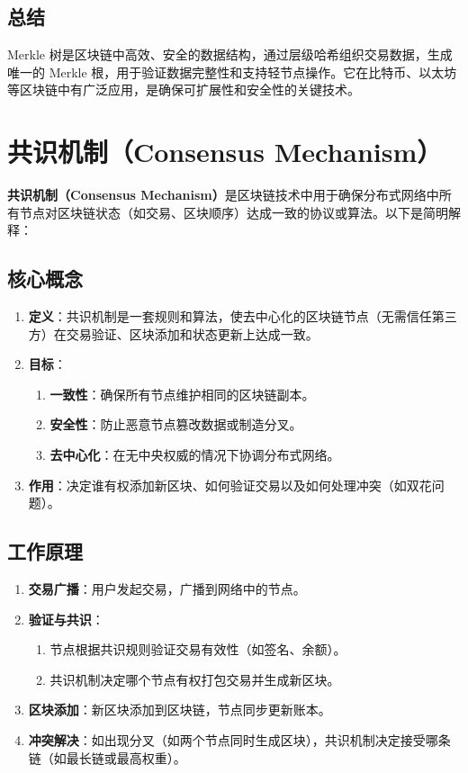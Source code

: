 \documentclass[12pt]{ctexart}
\begin{document}
\subsection{总结}
Merkle 树是区块链中高效、安全的数据结构，通过层级哈希组织交易数据，生成唯一的 Merkle 根，用于验证数据完整性和支持轻节点操作。它在比特币、以太坊等区块链中有广泛应用，是确保可扩展性和安全性的关键技术。

\newpage

\section{共识机制（Consensus Mechanism）}
\textbf{共识机制（Consensus Mechanism）}是区块链技术中用于确保分布式网络中所有节点对区块链状态（如交易、区块顺序）达成一致的协议或算法。以下是简明解释：

\subsection{核心概念}
\begin{enumerate}
    \item \textbf{定义}：共识机制是一套规则和算法，使去中心化的区块链节点（无需信任第三方）在交易验证、区块添加和状态更新上达成一致。
    \item \textbf{目标}：
        \begin{enumerate}
            \item \textbf{一致性}：确保所有节点维护相同的区块链副本。
            \item \textbf{安全性}：防止恶意节点篡改数据或制造分叉。
            \item \textbf{去中心化}：在无中央权威的情况下协调分布式网络。
        \end{enumerate}
    \item \textbf{作用}：决定谁有权添加新区块、如何验证交易以及如何处理冲突（如双花问题）。
\end{enumerate}

\subsection{工作原理}
\begin{enumerate}
    \item \textbf{交易广播}：用户发起交易，广播到网络中的节点。
    \item \textbf{验证与共识}：
        \begin{enumerate}
            \item 节点根据共识规则验证交易有效性（如签名、余额）。
            \item 共识机制决定哪个节点有权打包交易并生成新区块。
        \end{enumerate}
    \item \textbf{区块添加}：新区块添加到区块链，节点同步更新账本。
    \item \textbf{冲突解决}：如出现分叉（如两个节点同时生成区块），共识机制决定接受哪条链（如最长链或最高权重）。
\end{enumerate}
\end{document}
